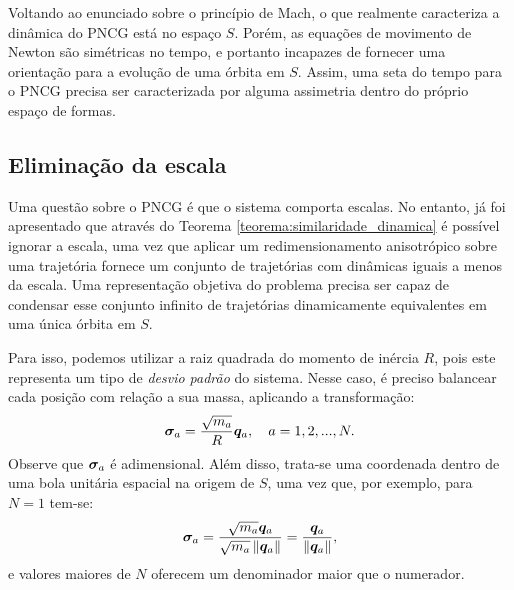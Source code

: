 

Voltando ao enunciado sobre o princípio de Mach, o que realmente caracteriza a dinâmica do PNCG está no espaço $S$. Porém, as equações de movimento de Newton são simétricas no tempo, e portanto incapazes de fornecer uma orientação para a evolução de uma órbita em $S$. Assim, uma seta do tempo para o PNCG precisa ser caracterizada por alguma assimetria dentro do próprio espaço de formas.


\subsection{Eliminação da escala}
Uma questão sobre o PNCG é que o sistema comporta escalas. No entanto, já foi apresentado que através do Teorema \ref{teorema:similaridade_dinamica} é possível ignorar a escala, uma vez que aplicar um redimensionamento anisotrópico sobre uma trajetória fornece um conjunto de trajetórias com dinâmicas iguais a menos da escala. Uma representação objetiva do problema precisa ser capaz de condensar esse conjunto infinito de trajetórias dinamicamente equivalentes em uma única órbita em $S$. 

Para isso, podemos utilizar a raiz quadrada do momento de inércia $R$, pois este representa um tipo de \textit{desvio padrão} do sistema. Nesse caso, é preciso balancear cada posição com relação a sua massa, aplicando a transformação:
\begin{equation}
    \bm \sigma_a = \dfrac{\sqrt{m_a}}{R} \bm q_a,
    \quad a = 1, 2, ..., N.
\end{equation}
Observe que $\bm \sigma_a$ é adimensional. Além disso, trata-se uma coordenada dentro de uma bola unitária espacial na origem de $S$, uma vez que, por exemplo, para $N=1$ tem-se:
\begin{equation*}
    \bm \sigma_a = \dfrac{\sqrt{m_a} \bm q_a}{\sqrt{m_a} \left\Vert \bm q_a \right\Vert} = \dfrac{\bm q_a}{\left\Vert \bm q_a \right\Vert},
\end{equation*}
e valores maiores de $N$ oferecem um denominador maior que o numerador.


